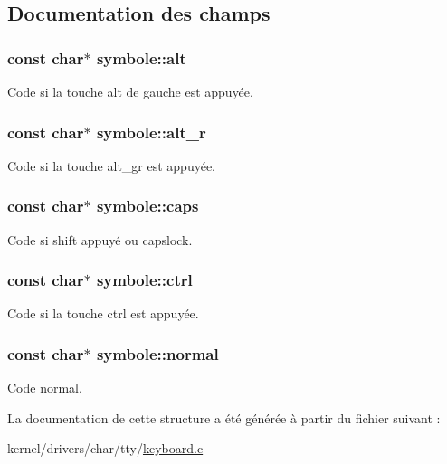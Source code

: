 \subsection{Documentation des champs}
\hypertarget{structsymbole_a35f794a092160ffe7926bbf11c670298}{
\subsubsection[{alt}]{\setlength{\rightskip}{0pt plus 5cm}const char$\ast$ symbole\+::alt}}\label{structsymbole_a35f794a092160ffe7926bbf11c670298}
Code si la touche alt de gauche est appuyée. \hypertarget{structsymbole_abd9f93b644b1d63156ff92f3f1a65649}{
\subsubsection[{alt\+\_\+r}]{\setlength{\rightskip}{0pt plus 5cm}const char$\ast$ symbole\+::alt\+\_\+r}}\label{structsymbole_abd9f93b644b1d63156ff92f3f1a65649}
Code si la touche alt\+\_\+gr est appuyée. \hypertarget{structsymbole_a817ffc97047283180645063db79a621d}{
\subsubsection[{caps}]{\setlength{\rightskip}{0pt plus 5cm}const char$\ast$ symbole\+::caps}}\label{structsymbole_a817ffc97047283180645063db79a621d}
Code si shift appuyé ou capslock. \hypertarget{structsymbole_a2383cac8f05d012336683f0af44535b5}{
\subsubsection[{ctrl}]{\setlength{\rightskip}{0pt plus 5cm}const char$\ast$ symbole\+::ctrl}}\label{structsymbole_a2383cac8f05d012336683f0af44535b5}
Code si la touche ctrl est appuyée. \hypertarget{structsymbole_a325f3bf3c7b29dbc931ec1a61df19bea}{
\subsubsection[{normal}]{\setlength{\rightskip}{0pt plus 5cm}const char$\ast$ symbole\+::normal}}\label{structsymbole_a325f3bf3c7b29dbc931ec1a61df19bea}
Code normal. 

La documentation de cette structure a été générée à partir du fichier suivant \+:\begin{DoxyCompactItemize}
\item 
kernel/drivers/char/tty/\hyperlink{keyboard_8c}{keyboard.\+c}\end{DoxyCompactItemize}
